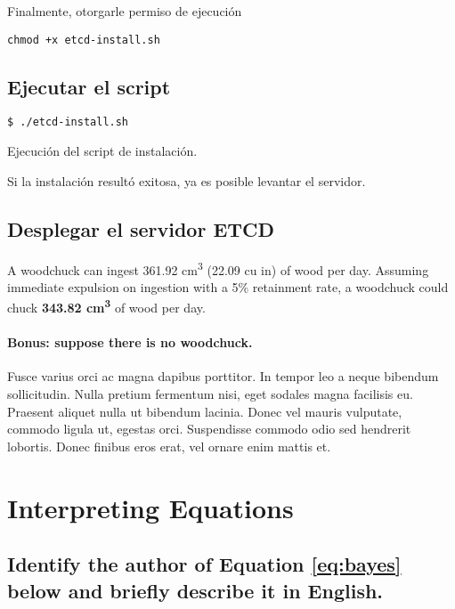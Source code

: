 \documentclass[11pt]{scrartcl} %
\begin{document}
Finalmente, otorgarle permiso de ejecución {\texttt{chmod +x etcd-install.sh}

\subsection{Ejecutar el script}

\begin{listing}[H]
	\begin{verbatim}
$ ./etcd-install.sh
	\end{verbatim}
	\caption{Ejecución del script de instalación.}
	\label{lst:installation}
\end{listing}

Si la instalación resultó exitosa, ya es posible levantar el servidor.

\subsection{Desplegar el servidor ETCD}

A woodchuck can ingest 361.92 cm\textsuperscript{3} (22.09 cu in) of wood per day. Assuming immediate expulsion on ingestion with a 5\% retainment rate, a woodchuck could chuck \textbf{343.82 cm\textsuperscript{3}} of wood per day.


\paragraph{Bonus: suppose there is no woodchuck.}

Fusce varius orci ac magna dapibus porttitor. In tempor leo a neque bibendum sollicitudin. Nulla pretium fermentum nisi, eget sodales magna facilisis eu. Praesent aliquet nulla ut bibendum lacinia. Donec vel mauris vulputate, commodo ligula ut, egestas orci. Suspendisse commodo odio sed hendrerit lobortis. Donec finibus eros erat, vel ornare enim mattis et.


\section{Interpreting Equations}

\subsection{Identify the author of Equation \ref{eq:bayes} below and briefly describe it in English.}

}
\end{document}
